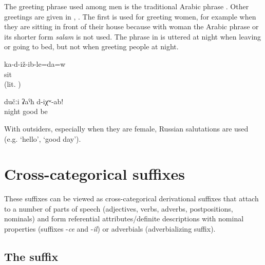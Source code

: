 The greeting phrase used among men is the traditional Arabic phrase . Other greetings are given in , . The first is used for greeting women, for example when they are sitting in front of their house because with woman the Arabic phrase or its shorter form \textit{salam} is not used. The phrase in  is uttered at night when leaving or going to bed, but not when greeting people at night. 
%
\begin{exe}
	\ex	\label{ex:Are you sitting minor}
	\gll	ka-d-iž-ib-le=da=w\\
		sit\\
	\glt	{} (lit. )

	\ex	\label{ex:‎‎‎Good night minor}
	\gll	dučːi	ʡaˁħ	d-iχʷ-ab!\\
		night	good	be\\
	\glt	{}
\end{exe}

With outsiders, especially when they are female, Russian salutations are used (e.g.  `hello',  `good day').





\section{Cross-categorical suffixes}
\label{sec:Cross-categorical derivational suffixes}

These suffixes can be viewed as cross-categorical derivational suffixes that attach to a number of parts of speech (adjectives, verbs, adverbs, postpositions, nominals) and form referential attributes\slash definite descriptions with nominal properties (suffixes -\textit{ce} and -\textit{il}) or adverbials (adverbializing suffix).


\subsection{The suffix  }
\label{ssec:The -ce / -te attributive}
